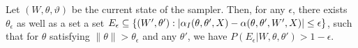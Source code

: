 \begin{proposition}
  Let $(W, \theta, \vartheta)$ be the current state of the sampler.
Then, for any $\epsilon$, there exists $\theta_\epsilon$ as well as a set a set $E_\epsilon \subseteq \{(W', \theta'): |\alpha_I(\theta,\theta',X) - \alpha(\theta,\theta',W',X)| \le \epsilon\}$, such that for $\theta$ satisfying $\parallel \theta \parallel > \theta_\epsilon$ and any $\theta'$, we have
$P(E_\epsilon|W,\theta,\theta') > 1-\epsilon$.
\label{prop:mix0}
\end{proposition}
